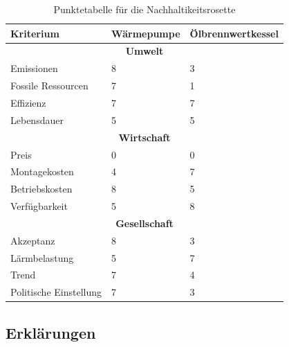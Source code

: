 \begin{table}
\begin{center}
\begin{tabular}[c]{|p{}|p{}|p{}|}

  \hline
  \textbf{\Large{Kriterium}} &
  \textbf{\Large{Wärmepumpe}} &
  \textbf{\Large{Ölbrennwertkessel}} \\ \hline

  \multicolumn{3}{|c|}{\textbf{\Large{Umwelt}}} \\ \hline
  
  Emissionen
  & 8 & 3 \\
  Fossile Ressourcen
  & 7 & 1 \\
  Effizienz
  & 7 & 7 \\
  Lebensdauer
  & 5 & 5 \\ %
  \hline
  
  \multicolumn{3}{|c|}{\textbf{\Large{Wirtschaft}}} \\ \hline
  
  Preis
  & 0 & 0 \\ %
  Montagekosten
  & 4 & 7 \\
  Betriebskosten
  & 8 & 5 \\
  Verfügbarkeit
  & 5 & 8 \\
  \hline

  \multicolumn{3}{|c|}{\textbf{\Large{Gesellschaft}}} \\ \hline

  Akzeptanz
  & 8 & 3 \\
  Lärmbelastung
  & 5 & 7 \\
  Trend
  & 7 & 4 \\
  Politische Einstellung
  & 7 & 3 \\ %
  \hline

\end{tabular}
\end{center}
\label{rosette:score}
\caption{Punktetabelle für die Nachhaltikeitsrosette}
\end{table}


\subsection{Erklärungen}

